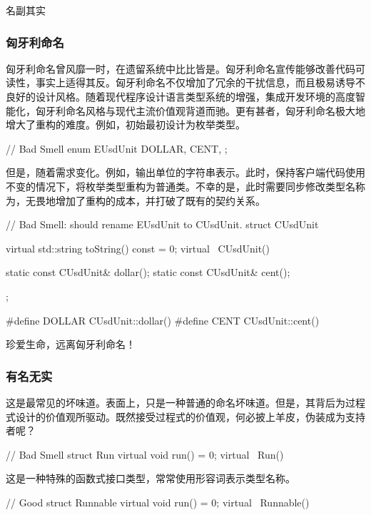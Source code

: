 \begin{content}
\begin{episode}{名副其实}
\begin{content}
\subsubsection{匈牙利命名}

匈牙利命名曾风靡一时，在遗留系统中比比皆是。匈牙利命名宣传能够改善代码可读性，事实上适得其反。匈牙利命名不仅增加了冗余的干扰信息，而且极易诱导不良好的设计风格。随着现代程序设计语言类型系统的增强，集成开发环境的高度智能化，匈牙利命名风格与现代主流价值观背道而驰。更有甚者，匈牙利命名极大地增大了重构的难度。例如，初始最初设计为枚举类型。

\begin{c++}[title={\ttfamily{匈牙利命名: 枚举类型}}]
// Bad Smell
enum EUsdUnit {
  DOLLAR,
  CENT,
};
\end{c++}

但是，随着需求变化。例如，输出单位的字符串表示。此时，保持客户端代码使用不变的情况下，将枚举类型重构为普通类。不幸的是，此时需要同步修改类型名称为，无畏地增加了重构的成本，并打破了既有的契约关系。

\begin{c++}[title={\ttfamily{匈牙利命名: 枚举类型重构为类类型}}]
// Bad Smell: should rename EUsdUnit to CUsdUnit.
struct CUsdUnit {
  virtual std::string toString() const = 0;
  virtual ~CUsdUnit() {}

  static const CUsdUnit& dollar();
  static const CUsdUnit& cent();
};

#define DOLLAR CUsdUnit::dollar()
#define CENT   CUsdUnit::cent()
\end{c++}

珍爱生命，远离匈牙利命名！

\subsubsection{有名无实}

这是最常见的坏味道。表面上，只是一种普通的命名坏味道。但是，其背后为过程式设计的价值观所驱动。既然接受过程式的价值观，何必披上羊皮，伪装成为支持者呢？

\begin{c++}
// Bad Smell
struct Run {
  virtual void run() = 0;
  virtual ~Run() {}
}
\end{c++}

这是一种特殊的函数式接口类型，常常使用形容词表示类型名称。

\begin{c++}
// Good
struct Runnable {
  virtual void run() = 0;
  virtual ~Runnable() {}
}
\end{c++}


\end{content}
\end{episode}
\end{content}
